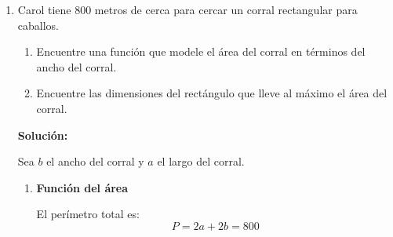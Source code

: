 \documentclass[12pt]{article}
\begin{document}
\begin{enumerate}[label=\alph*.-]
\begin{enumerate}[label=\roman*.]
        Por lo tanto: \[\boxed{V = \left(6.25, 8.125\right)}\] 
        
        y la altura máxima es \[\boxed{y_{\max} = 8.125 \text{ pies}}\]
        
        \item \textbf{Longitud de la patada}
        
        La patada termina cuando el balón toca el suelo, es decir, cuando $y = 0$.
        
        Resolvemos:
        \[0 = -0.08x^2 + x + 5\]
        
        Multiplicando por $-12.5$:
        \[0 = x^2 - 12.5x - 62.5\]
        
        Usando la fórmula cuadrática:
        \[x = \frac{-b \pm \sqrt{b^2 - 4ac}}{2a} = \frac{12.5 \pm \sqrt{(12.5)^2 - 4(1)(-62.5)}}{2}\]
        \[x = \frac{12.5 \pm \sqrt{156.25 + 250}}{2} = \frac{12.5 \pm \sqrt{406.25}}{2}\]
        \[x = \frac{12.5 \pm 20.156}{2}\]
        
        Las soluciones son:
        \[x_1 = \frac{12.5 + 20.156}{2} \approx 16.33 \text{ pies}\]
        \[x_2 = \frac{12.5 - 20.156}{2} \approx -3.83 \text{ pies (descartamos ya que no existen longitudes negativas)}\]
        
        Por lo tanto: \[\boxed{x_{\max} \approx 16.33 \text{ pies}}\]
    \end{enumerate}
    
    \newpage
    
    \item Carol tiene 800 metros de cerca para cercar un corral rectangular para caballos.
    \begin{enumerate}[label=\roman*.]
        \item Encuentre una función que modele el área del corral en términos del ancho del corral.
        \item Encuentre las dimensiones del rectángulo que lleve al máximo el área del corral.
    \end{enumerate}
    
    \textbf{Solución:}
    
    Sea $b$ el ancho del corral y $a$ el largo del corral.
    
    \begin{enumerate}[label=\roman*.]
        \item \textbf{Función del área}
        
        El perímetro total es:
        \[P = 2a + 2b = 800\]
        

\end{enumerate}
\end{enumerate}
\end{document}

